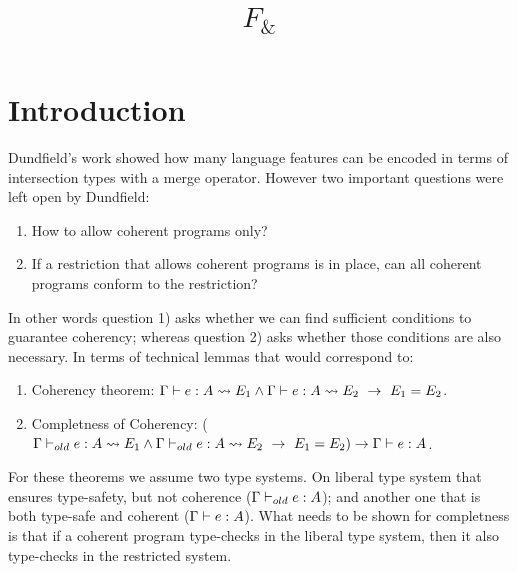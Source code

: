 \documentclass[preprint]{sigplanconf}
\newcommand{\name}{{\bf $F_{\&}$}\xspace}
\begin{document}
\section{Introduction}

Dundfield's work showed how many language features can be encoded in terms
of intersection types with a merge operator. However two important
questions were left open by Dundfield:

\begin{enumerate}

\item How to allow coherent programs only?

\item If a restriction that allows coherent programs is in place, can
  all coherent programs conform to the restriction?

\end{enumerate}

In other words question 1) asks whether we can find sufficient
conditions to guarantee coherency; whereas question 2) asks
whether those conditions are also necessary. In terms of technical
lemmas that would correspond to:

\begin{enumerate}

\item Coherency theorem: $\Gamma \vdash e : A \leadsto E_1 \wedge
  \Gamma \vdash e : A \leadsto E_2~\to~E_1 = E_2$.

\item Completness of Coherency: ($\Gamma \vdash_{old} e : A \leadsto E_1 \wedge
  \Gamma \vdash_{old} e : A \leadsto E_2~\to~E_1 = E_2) \to \Gamma
  \vdash e : A$.

\end{enumerate}

For these theorems we assume two type systems. On liberal type system
that ensures type-safety, but not coherence ($\Gamma \vdash_{old} e :
A$); and another one that is both type-safe and coherent  ($\Gamma \vdash e :
A$). What needs to be shown for completness is that if a coherent
program type-checks in the liberal type system, then it also
type-checks in the restricted system.


\setlength{\pdfpageheight}{\paperheight}
\setlength{\pdfpagewidth}{\paperwidth}

\title{\name}

\end{document}
